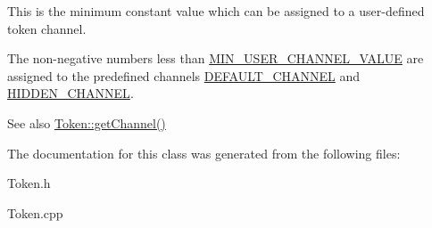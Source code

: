 This is the minimum constant value which can be assigned to a user-\/defined token channel.

The non-\/negative numbers less than \hyperlink{classantlr4_1_1Token_aa43b01289ec2d195ced55255a37ad314}{M\+I\+N\+\_\+\+U\+S\+E\+R\+\_\+\+C\+H\+A\+N\+N\+E\+L\+\_\+\+V\+A\+L\+UE} are assigned to the predefined channels \hyperlink{classantlr4_1_1Token_a699cbc56affbddc079561e175cba8435}{D\+E\+F\+A\+U\+L\+T\+\_\+\+C\+H\+A\+N\+N\+EL} and \hyperlink{classantlr4_1_1Token_af9bee187eba93f908d76d6406883424a}{H\+I\+D\+D\+E\+N\+\_\+\+C\+H\+A\+N\+N\+EL}.

\begin{DoxySeeAlso}{See also}
\hyperlink{classantlr4_1_1Token_a92991c0566e4cb00ae2c5f9e7d8fe6b4}{Token\+::get\+Channel()} 
\end{DoxySeeAlso}


The documentation for this class was generated from the following files\+:\begin{DoxyCompactItemize}
\item 
Token.\+h\item 
Token.\+cpp\end{DoxyCompactItemize}
